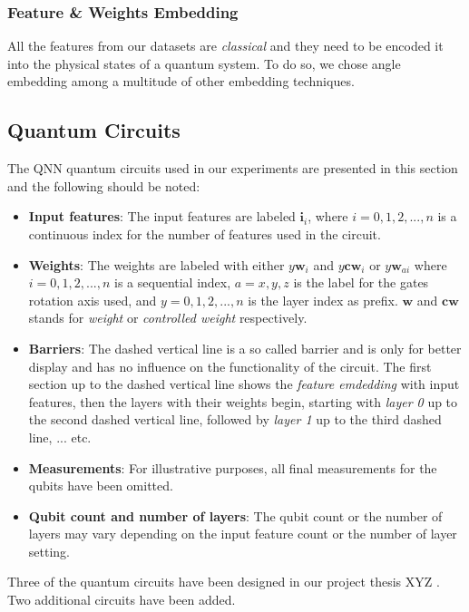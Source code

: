 \subsubsection{Feature \& Weights Embedding}
All the features from our datasets are \textit{classical} and they need to be encoded it into the physical states of a quantum system. To do so, we chose angle embedding among a multitude of other embedding techniques. 

\subsection{Quantum Circuits}
\label{subsection:qnn_quantum_circuits}

The QNN quantum circuits used in our experiments are presented in this section and the following should be noted:

\begin{itemize}
  \item \textbf{Input features}: The input features are labeled $\mathbf{i}_i$, where $i = 0,1,2,...,n$ is a continuous index for the number of features used in the circuit.
  \item \textbf{Weights}: The weights are labeled with either $y\mathbf{w}_i$ and $y\mathbf{cw}_i$ or $y\mathbf{w}_{ai}$ where $i = 0,1,2,...,n$ is a sequential index, $a = x,y,z$ is the label for the gates rotation axis used, and $y = 0,1,2,...,n$ is the layer index as prefix. $\mathbf{w}$ and $\mathbf{cw}$ stands for \textit{weight} or \textit{controlled weight} respectively.
  \item \textbf{Barriers}: The dashed vertical line is a so called barrier and is only for better display and has no influence on the functionality of the circuit. The first section up to the dashed vertical line shows the \textit{feature emdedding} with input features, then the layers with their weights begin, starting with \textit{layer 0} up to the second dashed vertical line, followed by \textit{layer 1} up to the third dashed line, ... etc.
  \item \textbf{Measurements}: For illustrative purposes, all final measurements for the qubits have been omitted.
  \item \textbf{Qubit count and number of layers}: The qubit count or the number of layers may vary depending on the input feature count or the number of layer setting.
\end{itemize}

Three of the quantum circuits have been designed in our project thesis XYZ . Two additional circuits have been added.

